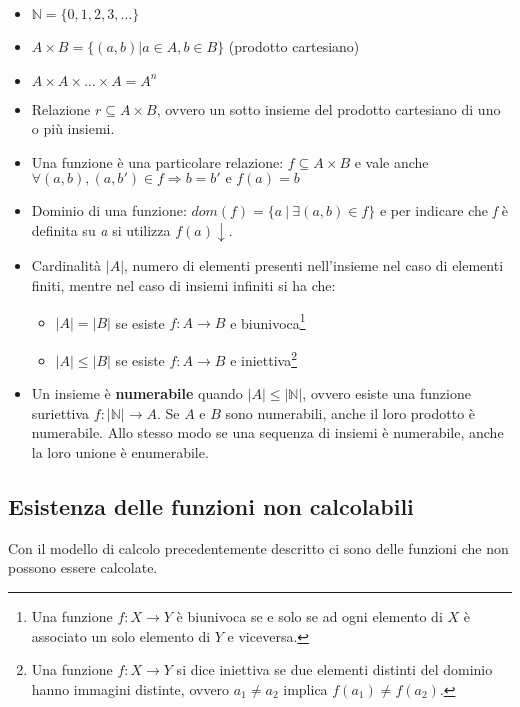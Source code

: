 \begin{itemize}
\item
  $ \mathbb{N}= \{0,1,2,3,\ldots{}\}$
\item
  $A \times B = \{(a,b) | a \in A, b \in B\}$ (prodotto cartesiano)
\item
  $A \times A \times \ldots \times A = A^n$
\item
  Relazione $r \subseteq A \times B$, ovvero un sotto insieme del prodotto
  cartesiano di uno o più insiemi.
\item
  Una funzione è una particolare relazione: $f \subseteq A \times B$ e vale anche
  $\forall(a,b), (a,b') \in f \Rightarrow b = b' \text{ e } f(a) = b$
\item
  Dominio di una funzione: $dom(f) = \{a \: | \: \exists (a,b) \in f\}$ e
  per indicare che \textit{f} è definita su \textit{a} si utilizza $f(a)\downarrow$.
\item
  Cardinalità $|A|$, numero di elementi presenti
  nell'insieme nel caso di elementi finiti, mentre nel caso di insiemi
  infiniti si ha che:

  \begin{itemize}
  \item $|A| = |B|$ se esiste $f: A \rightarrow B$ e biunivoca\footnote{Una funzione $ f : X \rightarrow Y$ è biunivoca se e solo se ad ogni elemento di $ X $ è associato un solo elemento di $ Y $ e viceversa.}
  \item $|A| \leq |B|$ se esiste $f: A \rightarrow B$ e iniettiva\footnote{Una funzione $ f: X\rightarrow Y $ si dice iniettiva se due elementi distinti del dominio hanno immagini distinte, ovvero $a_1\neq a_2$ implica $f(a_1)\neq f(a_2)$.}
  \end{itemize}
\item
  Un insieme è \textbf{numerabile} quando $|A| \leq |\mathbb{N}|$, ovvero esiste una funzione suriettiva $f: |\mathbb{N}| \rightarrow A$. 
  Se $ A $ e $ B $ sono numerabili, anche il
  loro prodotto è numerabile. Allo stesso modo se una sequenza di
  insiemi è numerabile, anche la loro unione è enumerabile.
\end{itemize}

\subsection{Esistenza delle funzioni non calcolabili}\label{esistenza-delle-funzioni-non-calcolabili}

Con il modello di calcolo precedentemente descritto ci sono delle
funzioni che non possono essere calcolate.

